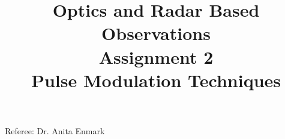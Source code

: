 \documentclass{article}
\title{\textbf {Optics and Radar Based Observations} \\ Assignment 2\\ Pulse Modulation Techniques} %
\author{\authors}
\begin{document}
\maketitle %

\centerline{Referee: Dr. Anita Enmark}


\setlength\parindent{0pt} %

\renewcommand{\labelenumi}{\alph{enumi}.} %
\clearpage

\tableofcontents

\listoffigures

\clearpage

\end{document}
